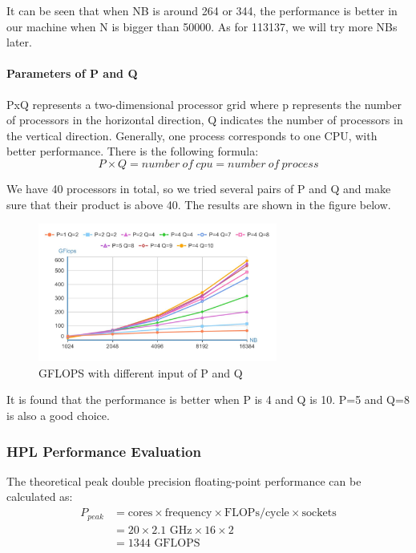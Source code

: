 \documentclass[a4paper,12pt]{article}
\begin{document}
It can be seen that when NB is around 264 or 344, the performance is better in our machine when N is bigger than 50000. As for 113137, we will try more NBs later.

\paragraph{Parameters of P and Q}

PxQ represents a two-dimensional processor grid where p represents the number of processors in the horizontal direction, Q indicates the number of processors in the vertical direction. Generally, one process corresponds to one CPU, with better performance. There is the following formula:
\begin{equation*}
P \times Q = number\ of\ cpu = number\ of\ process
\end{equation*}

We have 40 processors in total, so we tried several pairs of P and Q and make sure that their product is above 40. The results are shown in the figure below.

\begin{figure}[H]
    \centering
    \includegraphics[width=0.7\textwidth]{images/performance/GFLOPS_PQ.png}
    \caption{GFLOPS with different input of P and Q}
    \label{fig:gflops_pq}
\end{figure}

It is found that the performance is better when P is 4 and Q is 10. P=5 and Q=8 is also a good choice.

\subsubsection{HPL Performance Evaluation}

The theoretical peak double precision floating-point performance can be calculated as:
\begin{equation}
    \begin{split}
        P_{peak} &= \text{cores} \times \text{frequency} \times \text{FLOPs/cycle} \times \text{sockets} \\
        &= 20 \times 2.1\text{ GHz} \times 16 \times 2 \\
        &= 1344 \text{ GFLOPS}
    \end{split}
\end{equation}
\end{document}

